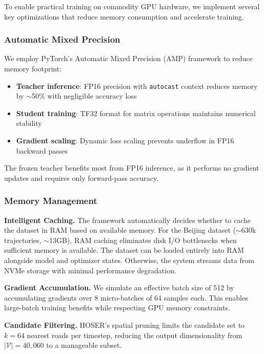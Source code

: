 To enable practical training on commodity GPU hardware, we implement several key optimizations that reduce memory consumption and accelerate training.

\subsubsection{Automatic Mixed Precision}

We employ PyTorch's Automatic Mixed Precision (AMP) framework to reduce memory footprint:

\begin{itemize}[noitemsep,topsep=0pt]
    \item \textbf{Teacher inference}: FP16 precision with \texttt{autocast} context reduces memory by $\sim$50\% with negligible accuracy loss
    \item \textbf{Student training}: TF32 format for matrix operations maintains numerical stability
    \item \textbf{Gradient scaling}: Dynamic loss scaling prevents underflow in FP16 backward passes
\end{itemize}

The frozen teacher benefits most from FP16 inference, as it performs no gradient updates and requires only forward-pass accuracy.

\subsubsection{Memory Management}

\textbf{Intelligent Caching.} The framework automatically decides whether to cache the dataset in RAM based on available memory. For the Beijing dataset ($\sim$630k trajectories, $\sim$13GB), RAM caching eliminates disk I/O bottlenecks when sufficient memory is available. The dataset can be loaded entirely into RAM alongside model and optimizer states. Otherwise, the system streams data from NVMe storage with minimal performance degradation.

\textbf{Gradient Accumulation.} We simulate an effective batch size of 512 by accumulating gradients over 8 micro-batches of 64 samples each. This enables large-batch training benefits while respecting GPU memory constraints.

\textbf{Candidate Filtering.} HOSER's spatial pruning limits the candidate set to $k = 64$ nearest roads per timestep, reducing the output dimensionality from $|\mathcal{V}| = 40{,}060$ to a manageable subset.

